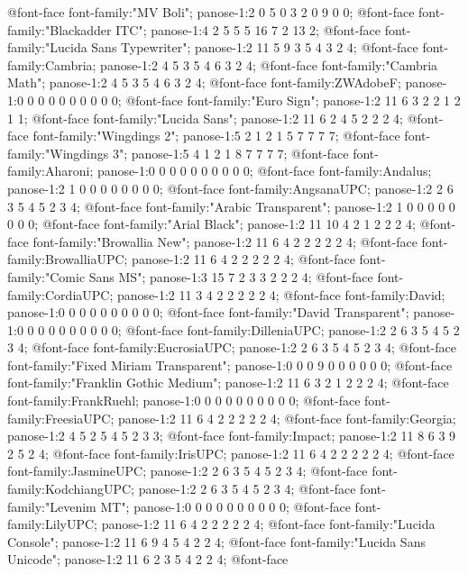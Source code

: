 @font-face
	{font-family:"MV Boli";
	panose-1:2 0 5 0 3 2 0 9 0 0;}
@font-face
	{font-family:"Blackadder ITC";
	panose-1:4 2 5 5 5 16 7 2 13 2;}
@font-face
	{font-family:"Lucida Sans Typewriter";
	panose-1:2 11 5 9 3 5 4 3 2 4;}
@font-face
	{font-family:Cambria;
	panose-1:2 4 5 3 5 4 6 3 2 4;}
@font-face
	{font-family:"Cambria Math";
	panose-1:2 4 5 3 5 4 6 3 2 4;}
@font-face
	{font-family:ZWAdobeF;
	panose-1:0 0 0 0 0 0 0 0 0 0;}
@font-face
	{font-family:"Euro Sign";
	panose-1:2 11 6 3 2 2 1 2 1 1;}
@font-face
	{font-family:"Lucida Sans";
	panose-1:2 11 6 2 4 5 2 2 2 4;}
@font-face
	{font-family:"Wingdings 2";
	panose-1:5 2 1 2 1 5 7 7 7 7;}
@font-face
	{font-family:"Wingdings 3";
	panose-1:5 4 1 2 1 8 7 7 7 7;}
@font-face
	{font-family:Aharoni;
	panose-1:0 0 0 0 0 0 0 0 0 0;}
@font-face
	{font-family:Andalus;
	panose-1:2 1 0 0 0 0 0 0 0 0;}
@font-face
	{font-family:AngsanaUPC;
	panose-1:2 2 6 3 5 4 5 2 3 4;}
@font-face
	{font-family:"Arabic Transparent";
	panose-1:2 1 0 0 0 0 0 0 0 0;}
@font-face
	{font-family:"Arial Black";
	panose-1:2 11 10 4 2 1 2 2 2 4;}
@font-face
	{font-family:"Browallia New";
	panose-1:2 11 6 4 2 2 2 2 2 4;}
@font-face
	{font-family:BrowalliaUPC;
	panose-1:2 11 6 4 2 2 2 2 2 4;}
@font-face
	{font-family:"Comic Sans MS";
	panose-1:3 15 7 2 3 3 2 2 2 4;}
@font-face
	{font-family:CordiaUPC;
	panose-1:2 11 3 4 2 2 2 2 2 4;}
@font-face
	{font-family:David;
	panose-1:0 0 0 0 0 0 0 0 0 0;}
@font-face
	{font-family:"David Transparent";
	panose-1:0 0 0 0 0 0 0 0 0 0;}
@font-face
	{font-family:DilleniaUPC;
	panose-1:2 2 6 3 5 4 5 2 3 4;}
@font-face
	{font-family:EucrosiaUPC;
	panose-1:2 2 6 3 5 4 5 2 3 4;}
@font-face
	{font-family:"Fixed Miriam Transparent";
	panose-1:0 0 0 9 0 0 0 0 0 0;}
@font-face
	{font-family:"Franklin Gothic Medium";
	panose-1:2 11 6 3 2 1 2 2 2 4;}
@font-face
	{font-family:FrankRuehl;
	panose-1:0 0 0 0 0 0 0 0 0 0;}
@font-face
	{font-family:FreesiaUPC;
	panose-1:2 11 6 4 2 2 2 2 2 4;}
@font-face
	{font-family:Georgia;
	panose-1:2 4 5 2 5 4 5 2 3 3;}
@font-face
	{font-family:Impact;
	panose-1:2 11 8 6 3 9 2 5 2 4;}
@font-face
	{font-family:IrisUPC;
	panose-1:2 11 6 4 2 2 2 2 2 4;}
@font-face
	{font-family:JasmineUPC;
	panose-1:2 2 6 3 5 4 5 2 3 4;}
@font-face
	{font-family:KodchiangUPC;
	panose-1:2 2 6 3 5 4 5 2 3 4;}
@font-face
	{font-family:"Levenim MT";
	panose-1:0 0 0 0 0 0 0 0 0 0;}
@font-face
	{font-family:LilyUPC;
	panose-1:2 11 6 4 2 2 2 2 2 4;}
@font-face
	{font-family:"Lucida Console";
	panose-1:2 11 6 9 4 5 4 2 2 4;}
@font-face
	{font-family:"Lucida Sans Unicode";
	panose-1:2 11 6 2 3 5 4 2 2 4;}
@font-face
